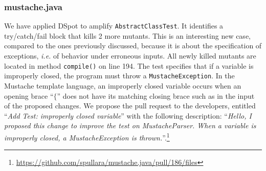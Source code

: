 \documentclass[table,xcdraw,smallextended]{svjour3}
\newcommand{\ie}{\textit{i.e.}\xspace}
\newcommand{\dspot}{DSpot\xspace}
\begin{document}
\subsubsection{mustache.java}


We have applied \dspot to amplify \texttt{AbstractClassTest}. It identifies a try/catch/fail block that kills 2 more mutants.
This is an interesting new case, compared to the ones previously discussed, because it is about the specification of exceptions, \ie of behavior under erroneous inputs.
All newly killed mutants are located in method \texttt{compile()} on line 194. The test specifies that if a variable is improperly closed, the program must throw a \texttt{MustacheException}. In the Mustache template language, an improperly closed variable occurs when an opening brace ``$\{$'' does not have its matching closing brace such as in the input of the proposed changes. We propose the pull request to the developers, entitled ``\emph{Add Test: improperly closed variable}'' with the following description: ``\emph{Hello, I proposed this change to improve the test on MustacheParser. When a variable is improperly closed, a MustacheException is thrown.}''.\footnote{\url{https://github.com/spullara/mustache.java/pull/186/files}}
\end{document}
